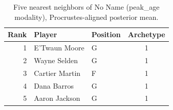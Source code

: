 \begin{table}[htbp]
  \centering\small
  \begin{tabular}{rllc}
    \toprule
    Rank & Player & Position & Archetype \\
    \midrule
    1 & E'Twaun Moore & G & 1 \\
    2 & Wayne Selden & G & 1 \\
    3 & Cartier Martin & F & 1 \\
    4 & Dana Barros & G & 1 \\
    5 & Aaron Jackson & G & 1 \\
    \bottomrule
  \end{tabular}
  \caption{Five nearest neighbors of No Name (peak_age modality), Procrustes-aligned posterior mean.}
  \label{tab:No_Name_neighbors_peak_age}
\end{table}

